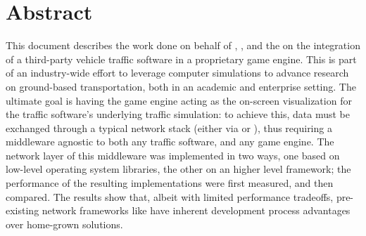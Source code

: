 \chapter*{Abstract}\label{ch:abstract}

This document describes the work done on behalf of , , and the  on the integration of a third-party vehicle traffic software in a proprietary game engine. This is part of an industry-wide effort to leverage computer simulations to advance research on ground-based transportation, both in an academic and enterprise setting. The ultimate goal is having the game engine acting as the on-screen visualization for the traffic software's underlying traffic simulation: to achieve this, data must be exchanged through a typical network stack (either via  or ), thus requiring a middleware agnostic to both any traffic software, and any game engine. The network layer of this middleware was implemented in two ways, one based on low-level operating system libraries, the other on an higher level framework; the performance of the resulting implementations were first measured, and then compared. The results show that, albeit with limited performance tradeoffs, pre-existing network frameworks like  have inherent development process advantages over home-grown solutions.
